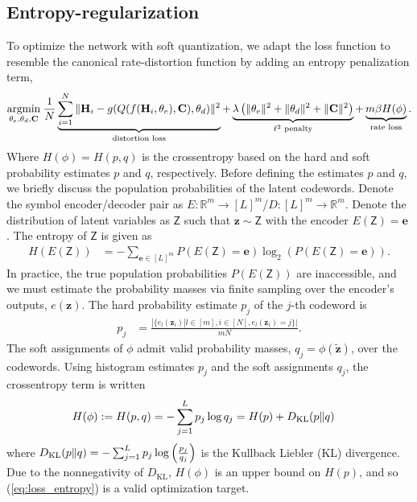 \subsection{Entropy-regularization}
To optimize the network with soft quantization, we adapt the loss function to resemble the canonical rate-distortion function by adding an entropy penalization term,
\begin{align}
\underset{\theta_e, \theta_d, \mathbf C}{\text{argmin}}\; \frac 1N \underbrace{\sum_{i=1}^N\Arrowvert \mathbf H_i - g(Q(f(\mathbf H_i, \theta_e), \mathbf C), \theta_d) \Arrowvert^2}_{\text{distortion loss}} + \underbrace{\lambda \left(\Arrowvert\theta_e\Arrowvert^2+\Arrowvert\theta_d\Arrowvert^2+\Arrowvert \mathbf C \Arrowvert^2\right)}_{\ell^2\text{ penalty}} + \underbrace{m\beta H(\phi)}_{\text{rate loss}}. \label{eq:loss_entropy}
\end{align}
Where $H(\phi)=H(p,q)$ is the crossentropy based on the hard and soft probability estimates $p$ and $q$, respectively. Before defining the estimates $p$ and $q$, we briefly discuss the population probabilities of the latent codewords. Denote the symbol encoder/decoder pair as $E:\mathbb R^m \to [L]^m$/$D:[L]^m \to \mathbb R^m$. Denote the distribution of latent variables as $\mathsf Z$ such that $\mathbf z \sim \mathsf Z$ with the encoder $E(\mathsf Z)=\mathbf e$ . The entropy of $\mathsf Z$ is given as 
\begin{align*}
H(E(\mathsf Z)) &= -\sum_{\mathbf e\in[L]^m}P(E(\mathsf Z) = \mathbf e)\log_2(P(E(\mathsf Z)=\mathbf e)).
\end{align*}
In practice, the true population probabilities $P(E(\mathsf Z))$ are inaccessible, and we must estimate the probability masses via finite sampling over the encoder's outputs, $e(\mathbf z)$. The hard probability estimate $p_j$ of the $j$-th codeword is
\begin{align*}
p_j &= \frac{|\{e_l(\mathbf z_i)|l\in[m], i \in [N], e_l(\mathbf z_i)=j\}|}{mN}.
\end{align*}
The soft assignments of $\phi$ admit valid probability masses, $q_j = \phi(\tilde{\mathbf z})$, over the codewords. Using histogram estimates $p_j$ and the soft assignments $q_j$, the crossentropy term is written
\begin{align*}
H(\phi) := H(p,q) &= -\sum_{j=1}^L p_j\log q_j = H(p) + D_{\text{KL}}(p\Arrowvert q)
\end{align*}
where $D_{\text{KL}}(p\Arrowvert q)=-\sum_{j=1}^L p_j \log\left(\frac{p_j}{q_j}\right)$ is the Kullback Liebler (KL) divergence. Due to the nonnegativity of $D_{\text{KL}}$, $H(\phi)$ is an upper bound on $H(p)$, and so (\ref{eq:loss_entropy}) is a valid optimization target.

